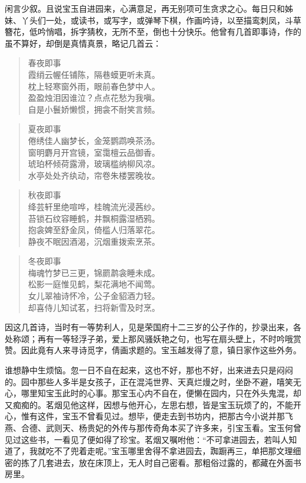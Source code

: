 \documentclass[12pt,oneside]{book}
\newenvironment{shici}{%
\begin{verse}%
\centering\large\hspace{12pt}}%
{\end{verse}}
\begin{document}
闲言少叙。且说宝玉自进园来，心满意足，再无别项可生贪求之心。每日只和姊妹、丫头们一处，或读书，或写字，或弹琴下棋，作画吟诗，以至描鸾刺凤，斗草簪花，低吟悄唱，拆字猜枚，无所不至，倒也十分快乐。他曾有几首即事诗，作的虽不算好，却倒是真情真景，略记几首云：

\begin{shici}
春夜即事\\
霞绡云幄任铺陈，隔巷蟆更听未真。\\
枕上轻寒窗外雨，眼前春色梦中人。\\
盈盈烛泪因谁泣？点点花愁为我嗔。\\
自是小鬟娇懒惯，拥衾不耐笑言频。
\end{shici}


\begin{shici}
夏夜即事\\
倦绣佳人幽梦长，金笼鹦鹉唤茶汤。\\
窗明麝月开宫镜，室霭檀云品御香。\\
琥珀杯倾荷露滑，玻璃槛纳柳风凉。\\
水亭处处齐纨动，帘卷朱楼罢晚妆。
\end{shici}

\begin{shici}
秋夜即事\\
绛芸轩里绝喧哗，桂魄流光浸茜纱。\\
苔锁石纹容睡鹤，井飘桐露湿栖鸦。\\
抱衾婢至舒金凤，倚槛人归落翠花。\\
静夜不眠因酒渴，沉烟重拨索烹茶。
\end{shici}

\begin{shici}
冬夜即事\\
梅魂竹梦已三更，锦罽鹔衾睡未成。\\
松影一庭惟见鹤，梨花满地不闻莺。\\
女儿翠袖诗怀冷，公子金貂酒力轻。\\
却喜侍儿知试茗，扫将新雪及时烹。
\end{shici}

因这几首诗，当时有一等势利人，见是荣国府十二三岁的公子作的，抄录出来，各处称颂；再有一等轻浮子弟，爱上那风骚妖艳之句，也写在扇头壁上，不时吟哦赏赞。因此竟有人来寻诗觅字，倩画求题的。宝玉越发得了意，镇日家作这些外务。

谁想静中生烦恼。忽一日不自在起来，这也不好，那也不好，出来进去只是闷闷的。园中那些人多半是女孩子，正在混沌世界、天真烂熳之时，坐卧不避，嘻笑无心，哪里知宝玉此时的心事。那宝玉心内不自在，便懒在园内，只在外头鬼混，却又痴痴的。茗烟见他这样，因想与他开心，左思右想，皆是宝玉玩烦了的，不能开心，惟有这件，宝玉不曾看见过。想毕，便走去到书坊内，把那古今小说并那飞燕、合德、武则天、杨贵妃的外传与那传奇角本买了许多来，引宝玉看。宝玉何曾见过这些书，一看见了便如得了珍宝。茗烟又嘱咐他：“不可拿进园去，若叫人知道了，我就吃不了兜着走呢。”宝玉哪里舍得不拿进园去，踟蹰再三，单把那文理细密的拣了几套进去，放在床顶上，无人时自己密看。那粗俗过露的，都藏在外面书房里。
\end{document}
